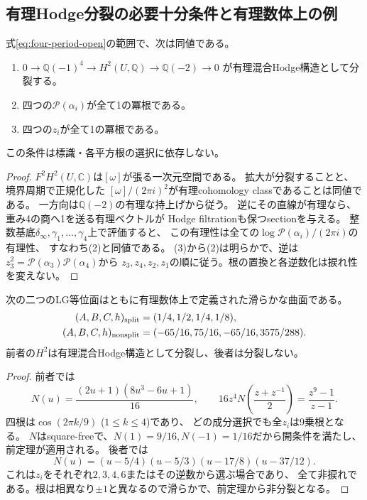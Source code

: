 \subsection{有理Hodge分裂の必要十分条件と有理数体上の例}
\begin{theorem}[四周期による有理分裂の完全判定]
\label{thm:four-period-rational-split}
式\eqref{eq:four-period-open}の範囲で、次は同値である。
\begin{enumerate}
 \item $0\to\mathbb Q(-1)^4\to H^2(U,\mathbb Q)\to\mathbb Q(-2)\to0$
 が有理混合Hodge構造として分裂する。
 \item 四つの$\mathcal P(\alpha_i)$が全て1の冪根である。
 \item 四つの$z_i$が全て1の冪根である。
\end{enumerate}
この条件は標識・各平方根の選択に依存しない。
\end{theorem}
\begin{proof}
$F^2H^2(U,\mathbb C)$は$[\omega]$が張る一次元空間である。
拡大が分裂することと、境界周期で正規化した
$[\omega]/(2\pi i)^2$が有理cohomology classであることは同値である。
一方向は$\mathbb Q(-2)$の有理な持上げから従う。
逆にその直線が有理なら、重み4の商へ1を送る有理ベクトルが
Hodge filtrationも保つsectionを与える。
整数基底$\delta_\infty,\gamma_1,\ldots,\gamma_4$上で評価すると、
この有理性は全ての$\log\mathcal P(\alpha_i)/(2\pi i)$の有理性、
すなわち(2)と同値である。
(3)から(2)は明らかで、逆は
$z_3^2=\mathcal P(\alpha_3)\mathcal P(\alpha_4)$から
$z_3,z_4,z_2,z_1$の順に従う。根の置換と各逆数化は捩れ性を変えない。
\end{proof}

\begin{proposition}[分裂・非分裂をともに有理係数で実現する]
\label{prop:rational-cyclotomic-examples}
次の二つのLG等位面はともに有理数体上で定義された滑らかな曲面である。
\begin{align*}
 (A,B,C,h)_{\rm split}&=(1/4,1/2,1/4,1/8),\\
 (A,B,C,h)_{\rm nonsplit}&=(-65/16,75/16,-65/16,3575/288).
\end{align*}
前者の$H^2$は有理混合Hodge構造として分裂し、後者は分裂しない。
\end{proposition}
\begin{proof}
前者では
\[
 N(u)=\frac{(2u+1)(8u^3-6u+1)}{16},\qquad
 16z^4N\!\left(\frac{z+z^{-1}}2\right)=\frac{z^9-1}{z-1}.
\]
四根は$\cos(2\pi k/9)$ ($1\le k\le4$)であり、
どの成分選択でも全$z_i$は9乗根となる。
$N$はsquare-freeで、$N(1)=9/16,N(-1)=1/16$だから開条件を満たし、前定理が適用される。
後者では
\[
 N(u)=(u-5/4)(u-5/3)(u-17/8)(u-37/12).
\]
これは$z_i$をそれぞれ$2,3,4,6$またはその逆数から選ぶ場合であり、
全て非捩れである。根は相異なり$\pm1$と異なるので滑らかで、前定理から非分裂となる。
\end{proof}

